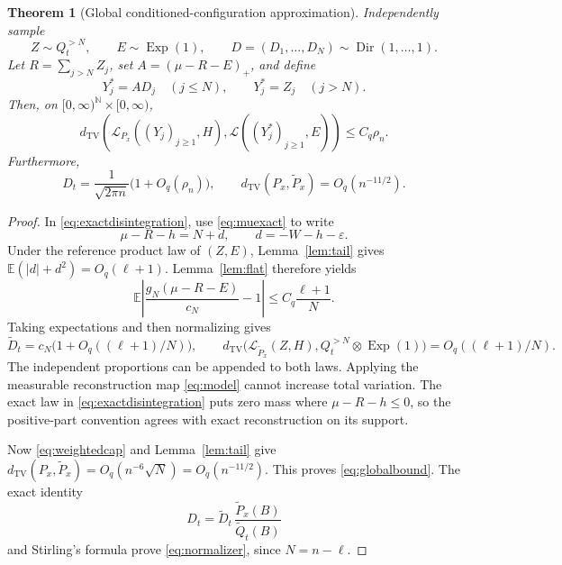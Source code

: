 \documentclass[11pt,letterpaper]{article}
\numberwithin{equation}{section}
\newtheorem{theorem}{Theorem}[section]
\theoremstyle{definition}
\theoremstyle{remark}
\newcommand{\EE}{\mathbb E}
\newcommand{\NN}{\mathbb N}
\newcommand{\TV}{d_{\mathrm{TV}}}
\newcommand{\Law}{\mathcal L}
\newcommand{\Exp}{\operatorname{Exp}}
\newcommand{\Dir}{\operatorname{Dir}}
\newcommand{\eps}{\varepsilon}
\begin{document}
\begin{theorem}[Global conditioned-configuration approximation]
\label{thm:global}
Independently sample
\[
 Z\sim Q_t^{>N},\qquad E\sim\Exp(1),\qquad
 D=(D_1,\ldots,D_N)\sim\Dir(1,\ldots,1).
\]
Let $R=\sum_{j>N}Z_j$, set $A=(\mu-R-E)_+$, and define
\begin{equation}
 Y_j^*=AD_j\quad(j\le N),\qquad Y_j^*=Z_j\quad(j>N).
 \label{eq:model}
\end{equation}
Then, on $[0,\infty)^{\NN}\times[0,\infty)$,
\begin{equation}
 \TV\!\left(\Law_{P_x}((Y_j)_{j\ge1},H),
                  \Law((Y_j^*)_{j\ge1},E)\right)
 \le C_q\rho_n.
 \label{eq:globalbound}
\end{equation}
Furthermore,
\begin{equation}
 D_t=\frac{1}{\sqrt{2\pi n}}\big(1+O_q(\rho_n)\big),\qquad
 \TV(P_x,\widetilde P_x)=O_q(n^{-11/2}).
 \label{eq:normalizer}
\end{equation}
\end{theorem}
\begin{proof}
In \eqref{eq:exactdisintegration}, use \eqref{eq:muexact} to write
\[
 \mu-R-h=N+d,\qquad d=-W-h-\eps.
\]
Under the reference product law of $(Z,E)$, Lemma~\ref{lem:tail} gives
$\EE(|d|+d^2)=O_q(\ell+1)$. Lemma~\ref{lem:flat} therefore yields
\[
 \EE\left|\frac{g_N(\mu-R-E)}{c_N}-1\right|
 \le C_q\frac{\ell+1}{N}.
\]
Taking expectations and then normalizing gives
\begin{equation}
 \widetilde D_t=c_N\big(1+O_q((\ell+1)/N)\big),\qquad
 \TV\big(\Law_{\widetilde P_x}(Z,H),
                  Q_t^{>N}\otimes\Exp(1)\big)
 =O_q((\ell+1)/N).
 \label{eq:tailjoint}
\end{equation}
The independent proportions can be appended to both laws. Applying the
measurable reconstruction map \eqref{eq:model} cannot increase total
variation. The exact law in \eqref{eq:exactdisintegration} puts zero mass
where $\mu-R-h\le0$, so the positive-part convention agrees with exact
reconstruction on its support.

Now \eqref{eq:weightedcap} and Lemma~\ref{lem:tail} give
$\TV(P_x,\widetilde P_x)=O_q(n^{-6}\sqrt N)=O_q(n^{-11/2})$.
This proves \eqref{eq:globalbound}. The exact identity
\[
 D_t=\widetilde D_t\,
 \frac{\widetilde P_x(B)}{\widetilde Q_t(B)}
\]
and Stirling's formula prove \eqref{eq:normalizer}, since $N=n-\ell$.
\end{proof}
\end{document}
